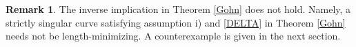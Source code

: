 \documentclass[12pt, reqno]{amsart}
\theoremstyle{plain}
\theoremstyle{definition}
\newtheorem{remark}[theorem]{Remark}
\theoremstyle{remark}
\numberwithin{equation}{section}
\renewcommand{\L}{\mathcal{L}}
\newcommand{\0}{\theta}
\newcommand{\g}{\gamma}
\newcommand{\la}{\lambda}
\newcommand{\1}{{-1}}
\renewcommand{\=}{\coloneqq}
\renewcommand{\.}{\dots}
\newcommand{\mc}{\mathcal}
\newcommand{\be}{\begin{equation}}
\newcommand{\ee}{\end{equation}}
\begin{document}
% 
% 
% 
%  
%  



 \begin{remark}
 \label{rk93}
 The inverse implication in Theorem \ref{Gohn} does not hold. Namely, a strictly singular curve satisfying assumption i) and \eqref{DELTA}  in Theorem \ref{Gohn} needs not be length-minimizing. A counterexample  is given in the next section.
\end{remark}
 
 
 
 
 
 
 
 
 
 
 
 
 
 
 
 
 
 
 
 
 
 
 
 
 
 
 
 
 
 
 
 
 
 
 
 
 
 
 
 
 
 
 
 
 
 
 
\end{document}
